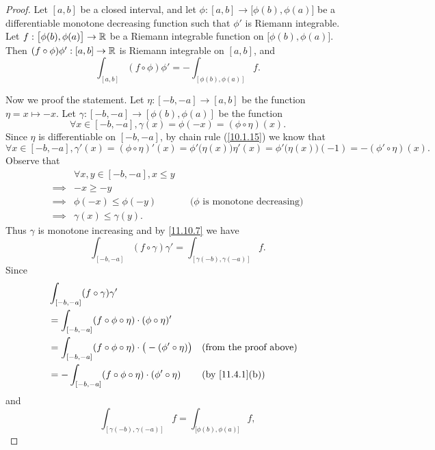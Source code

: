 \begin{proof}
  Let \([a, b]\) be a closed interval, and let \(\phi : [a, b] \to \big[\phi(b), \phi(a)\big]\) be a differentiable monotone decreasing function such that \(\phi'\) is Riemann integrable.
  Let \(f : \big[\phi(b), \phi(a)\big] \to \mathbb{R}\) be a Riemann integrable function on \(\big[\phi(b), \phi(a)\big]\).
  Then \((f \circ \phi) \phi' : [a, b] \to \mathbb{R}\) is Riemann integrable on \([a, b]\), and
  \[
    \int_{[a, b]} (f \circ \phi) \phi' = -\int_{[\phi(b), \phi(a)]} f.
  \]

  Now we proof the statement.
  Let \(\eta : [-b, -a] \to [a, b]\) be the function \(\eta = x \mapsto -x\).
  Let \(\gamma : [-b, -a] \to [\phi(b), \phi(a)]\) be the function
  \[
    \forall x \in [-b, -a], \gamma(x) = \phi(-x) = (\phi \circ \eta)(x).
  \]
  Since \(\eta\) is differentiable on \([-b, -a]\), by chain rule (\cref{10.1.15}) we know that
  \[
    \forall x \in [-b, -a], \gamma'(x) = (\phi \circ \eta)'(x) = \phi'\big(\eta(x)\big) \eta'(x) = \phi'\big(\eta(x)\big) (-1) = - (\phi' \circ \eta)(x).
  \]
  Observe that
  \begin{align*}
             & \forall x, y \in [-b, -a], x \leq y                                               \\
    \implies & -x \geq -y                                                                        \\
    \implies & \phi(-x) \leq \phi(-y)              &  & \text{(\(\phi\) is monotone decreasing)} \\
    \implies & \gamma(x) \leq \gamma(y).
  \end{align*}
  Thus \(\gamma\) is monotone increasing and by \cref{11.10.7} we have
  \[
    \int_{[-b, -a]} (f \circ \gamma) \gamma' = \int_{[\gamma(-b), \gamma(-a)]} f.
  \]
  Since
  \begin{align*}
     & \int_{[-b, -a]} (f \circ \gamma) \gamma'                                                                           \\
     & = \int_{[-b, -a]} (f \circ \phi \circ \eta) \cdot (\phi \circ \eta)'                                               \\
     & = \int_{[-b, -a]} (f \circ \phi \circ \eta) \cdot \big(-(\phi' \circ \eta)\big) &  & \text{(from the proof above)} \\
     & = -\int_{[-b, -a]} (f \circ \phi \circ \eta) \cdot (\phi' \circ \eta)           &  & \text{(by \cref{11.4.1}(b))}
  \end{align*}
  and
  \[
    \int_{[\gamma(-b), \gamma(-a)]} f = \int_{\big[\phi(b), \phi(a)\big]} f,
\]
\end{proof}
